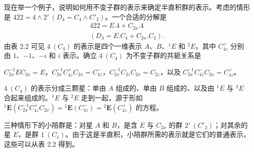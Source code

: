 现在举一个例子，说明如何用不变子群的表示来确定半直积群的表示。考虑的情形是 $422 = 4 \wedge 2'\ (D_{4} = C_{4} \wedge C'_{2})$。一个合适的分解是
\begin{equation*}
\begin{array}{l}
422 = E.4 + C_{2x}.4\\
\left(D_{4} = E.C_{4} + C_{2x}.C_{4}\right).
\end{array}
\tag{4.5.1}
\end{equation*}
由表 2.2 可见 $4\ (C_{4})$ 的表示是四个一维表示 $A$、$B$、${}^{1}E$ 和 ${}^{2}E$，其中 $C^{+}_{4z}$ 分别由 $1$、$-1$、$-i$ 和 $i$ 表示。确立 $4\ (C_{4})$ 为不变子群的共轭关系是
\begin{center}
$C^{-1}_{2x}EC_{2x} = E$，\quad $C^{-1}_{2x}C^{+}_{4z}C_{2x} = C^{-}_{4z}$，\quad $C^{-1}_{2x}C_{2z}C_{2x} = C_{2z}$，\quad 以及 $C^{-1}_{2x}C^{-}_{4z}C_{2x} = C^{+}_{4z}$。
\end{center}
$4\ (C_{4})$ 的表示分成三颗星：单由 $A$ 组成的、单由 $B$ 组成的、以及由 ${}^{1}E$ 与 ${}^{2}E$ 合起来组成的。${}^{1}E$ 与 ${}^{2}E$ 走到一起，源于形如 ${}^{1}\mathbf{E}(C^{-1}_{2x}C^{+}_{4z}C_{2x}) = {}^{1}\mathbf{E}(C^{-}_{4z}) = {}^{2}\mathbf{E}(C^{+}_{4z})$ 的方程。

三种情形下的小陪群是：对星 $A$ 和 $B$，是含 $E$ 与 $C_{2x}$ 的群 $2'\ (C'_{2})$；对其余的星 $E$，是群 $1\ (C_{1})$。由于这是半直积，小陪群所需的表示就是它们的普通表示，这些可以从表 2.2 得到。

